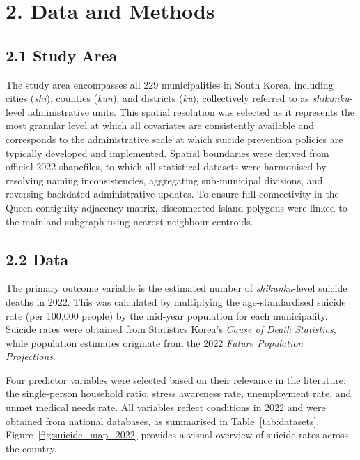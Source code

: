 \documentclass[11pt]{article}
\begin{document}
	\section*{2. Data and Methods}
	
	\subsection*{2.1 Study Area}	
	
	The study area encompasses all 229 municipalities in South Korea, including cities (\textit{shi}), counties (\textit{kun}), and districts (\textit{ku}), collectively referred to as \textit{shikunku}-level administrative units. This spatial resolution was selected as it represents the most granular level at which all covariates are consistently available and corresponds to the administrative scale at which suicide prevention policies are typically developed and implemented. Spatial boundaries were derived from official 2022 shapefiles, to which all statistical datasets were harmonised by resolving naming inconsistencies, aggregating sub-municipal divisions, and reversing backdated administrative updates. To ensure full connectivity in the Queen contiguity adjacency matrix, disconnected island polygons were linked to the mainland subgraph using nearest-neighbour centroids.
	
	\subsection*{2.2 Data}
	
	The primary outcome variable is the estimated number of \textit{shikunku}-level suicide deaths in 2022. This was calculated by multiplying the age-standardised suicide rate (per 100,000 people) by the mid-year population for each municipality. Suicide rates were obtained from Statistics Korea’s \textit{Cause of Death Statistics}, while population estimates originate from the 2022 \textit{Future Population Projections}.
		
	Four predictor variables were selected based on their relevance in the literature: the single-person household ratio, stress awareness rate, unemployment rate, and unmet medical needs rate. All variables reflect conditions in 2022 and were obtained from national databases, as summarised in Table~\ref{tab:datasets}. Figure~\ref{fig:suicide_map_2022} provides a visual overview of suicide rates across the country.
	
\end{document}
